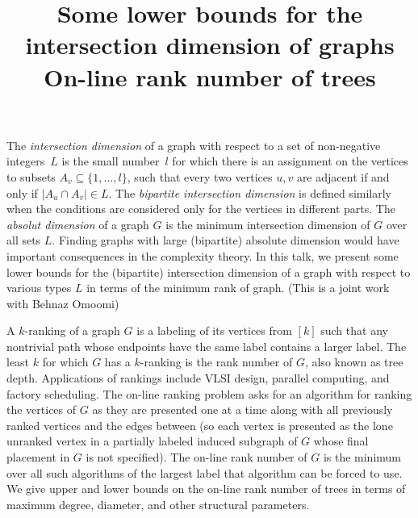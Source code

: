 \documentclass{article}
\begin{document}
\vspace{.25in}

\title{Some lower bounds for the intersection dimension of graphs}
\endtitle
The {\it intersection dimension} of a graph with respect to a set
of non-negative integers~$L$ is the small number~$l$ for which there is an
assignment on the vertices to subsets $A_v \subseteq \{1,\dots, l\}$, such
that every two vertices $u,v$ are adjacent if and only if $|A_u \cap A_v|\in
L$.
The {\it bipartite intersection dimension} is defined similarly when the
conditions are considered only for the vertices in different parts. The {\it
absolut dimension} of a graph $G$ is the minimum intersection dimension of
$G$ over all sets $L$. Finding graphs with large (bipartite) absolute
dimension would have important consequences in the complexity theory.
In this talk, we present some lower bounds for the (bipartite) intersection
dimension of a graph with respect to various types $L$ in terms of the
minimum rank of graph.
(This is a joint work with Behnaz Omoomi)




\vspace{.25in}

\title{ On-line rank number of trees}
\endtitle
A $k$-ranking of a graph $G$ is a labeling of its vertices from $[k]$ such that any nontrivial path whose endpoints have the same label contains a larger label.  The least $k$ for which $G$ has a $k$-ranking is the rank number of $G$, also known as tree depth.  Applications of rankings include VLSI design, parallel computing, and factory scheduling. The on-line ranking problem asks for an algorithm for ranking the vertices of $G$ as they are presented one at a time along with all previously ranked vertices and the edges between (so each vertex is presented as the lone unranked vertex in a partially labeled induced subgraph of $G$ whose final placement in $G$ is not specified).  The on-line rank number of $G$ is the minimum over all such algorithms of the largest label that algorithm can be forced to use.  We give upper and lower bounds on the on-line rank number of trees in terms of maximum degree, diameter, and other structural parameters.




\vspace{.25in}
\end{document}
